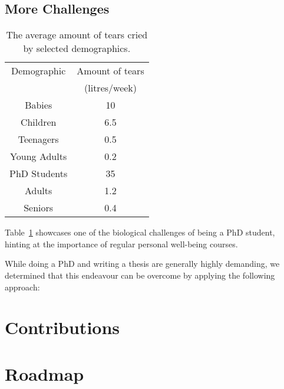 \subsection{More Challenges}
\begin{table}[h]
    \centering
    \begin{tabular}{|c|c|}\hline
         Demographic& Amount of tears  \\
         & (litres/week)\\\hline
         Babies&10\\
         Children&6.5\\
         Teenagers&0.5\\
         Young Adults&0.2\\
         PhD Students&35\\
         Adults&1.2\\
         Seniors&0.4\\\hline
    \end{tabular}
    \caption{The average amount of tears cried by selected demographics.}
    \label{tab:tears}
\end{table}
Table~\ref{tab:tears} showcases one of the biological challenges of being a PhD student, hinting at the importance of regular personal well-being courses. 

While doing a PhD and writing a thesis are generally highly demanding, we determined that this endeavour can be overcome by applying the following approach:\\
\begin{flushleft}
\end{flushleft}
\vspace{1cm}



\section{Contributions}
\label{sec:intro_contrib}

\section{Roadmap}
\label{sec:intro_road}


